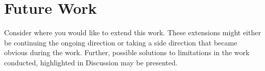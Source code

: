 \section{Future Work}

Consider where you would like to extend this work. These extensions might either be continuing the ongoing direction or taking a side direction that became obvious during the work. Further, possible solutions to limitations in the work conducted, highlighted in Discussion may be presented.






